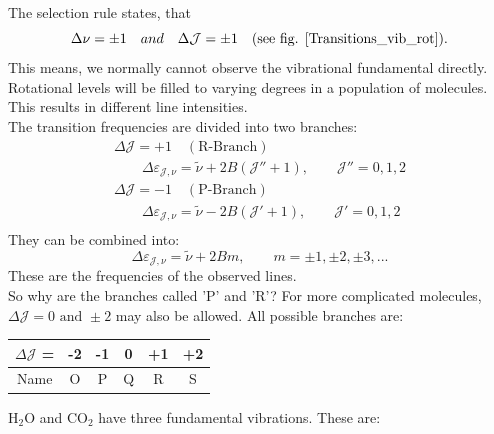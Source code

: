 \documentclass[a4paper,fleqn]{article}
\renewcommand{\epsilon}{\varepsilon}  %
\begin{document}
 The selection rule states, that
 \begin{equation}
\Delta \nu = \pm 1 \text \quad {and} \quad \Delta \mathcal{J} = \pm 1 \quad \text{(see fig. \ref{Transitions_vib_rot})}.
\end{equation}
This means, we normally cannot observe the vibrational fundamental directly. Rotational levels will be filled to varying degrees in a population of molecules. This results in different line intensities. \\
The transition frequencies are divided into two branches:
\begin{gather*}
\Delta \mathcal{J} = +1 \quad (\text{R-Branch}) \\
\qquad \Delta \epsilon_{\mathcal{J},\nu} = \tilde{\nu} + 2 B ( \mathcal{J''} + 1), 
	\qquad \mathcal{J''} = 0, 1, 2  \\
\Delta \mathcal{J} = -1 \quad (\text{P-Branch}) \\
\qquad \Delta \epsilon_{\mathcal{J},\nu} = \tilde{\nu} - 2 B ( \mathcal{J'} + 1) , 
	\qquad \mathcal{J'} = 0, 1, 2  \\ 
\end{gather*}
 They can be combined into: 
 \begin{equation}
\Delta \epsilon_{\mathcal{J},\nu} = \tilde{\nu} + 2 B m , 
	\qquad m = \pm1, \pm2, \pm3, ...
\end{equation}
These are the frequencies of the observed lines. \\
So why are the branches called 'P' and 'R'? For more complicated molecules, $\Delta \mathcal{J} = 0 \text{ and } \pm 2$ may also be allowed. All possible branches are:


\begin{center}
\begin{tabular}{|c|c|c|c|c|c|} \hline
$\Delta\mathcal{J}$ = & -2 & -1 & 0 & +1 & +2 \\
\hline
Name & O & P & Q & R & S \\
\hline
\end{tabular}
\end{center}

H$_2$O and CO$_2$ have three fundamental vibrations. These are:
\end{document}

